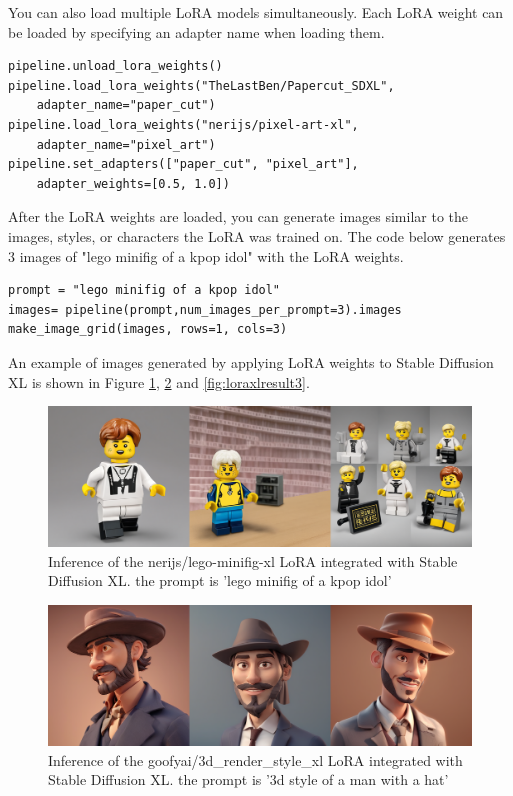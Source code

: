\documentclass[extendedabs]{bmvc2k}
\begin{document}
You can also load multiple LoRA models simultaneously. Each LoRA weight can be loaded by specifying an adapter name when loading them.

\begin{verbatim}
pipeline.unload_lora_weights()
pipeline.load_lora_weights("TheLastBen/Papercut_SDXL", 
    adapter_name="paper_cut")
pipeline.load_lora_weights("nerijs/pixel-art-xl", 
    adapter_name="pixel_art")
pipeline.set_adapters(["paper_cut", "pixel_art"], 
    adapter_weights=[0.5, 1.0])
\end{verbatim}

After the LoRA weights are loaded, you can generate images similar to the images, styles, or characters the LoRA was trained on. The code below generates 3 images of "lego minifig of a kpop idol" with the LoRA weights.

\begin{verbatim}
prompt = "lego minifig of a kpop idol"
images= pipeline(prompt,num_images_per_prompt=3).images
make_image_grid(images, rows=1, cols=3)
\end{verbatim}
An example of images generated by applying LoRA weights to Stable Diffusion XL is shown in Figure \ref{fig:loraxlresult1}, \ref{fig:loraxlresult2} and \ref{fig:loraxlresult3}.

\begin{figure}[t]
\centering
	\includegraphics[width=\linewidth]{images/xlkpopidol.png}
    
    
	\caption{
		Inference of the nerijs/lego-minifig-xl LoRA integrated with Stable Diffusion XL. the prompt is 'lego minifig of a kpop idol'}
	\vspace{-2mm}
        \label{fig:loraxlresult1}
\end{figure}

\begin{figure}[t]
\centering
	\includegraphics[width=\linewidth]{images/xl3d.png}
    
    
	\caption{
		Inference of the goofyai/3d\_render\_style\_xl LoRA integrated with Stable Diffusion XL. the prompt is '3d style of a man with a hat'}
	\vspace{-2mm}
        \label{fig:loraxlresult2}
\end{figure}
\end{document}
